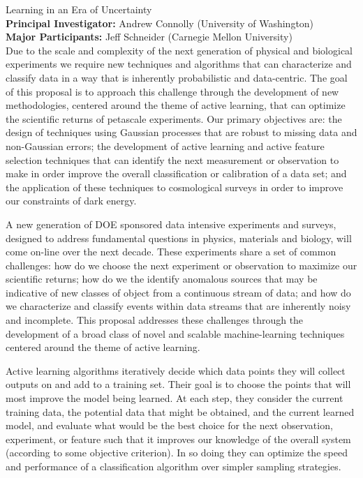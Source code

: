 \documentclass[useAMS,usenatbib,tightenlines,11pt,preprint]{aastex}
\begin{document}
 

  Learning in an Era of Uncertainty \\
{\bf Principal Investigator: } Andrew Connolly (University of Washington)\\
{\bf Major Participants: }  Jeff Schneider (Carnegie Mellon University) \\

 Due to the scale and complexity of
the next generation of physical and biological experiments we require
new techniques and algorithms that can characterize and classify data
in a way that is inherently probabilistic and data-centric.  The goal
of this proposal is to approach this challenge through the development of
new methodologies, centered around the theme of active learning, that
can optimize the scientific returns of petascale experiments. Our
primary objectives are: the design of techniques using Gaussian
processes that are robust to missing data and non-Gaussian errors; the
development of active learning and active feature selection techniques
that can identify the next measurement or observation to make in order 
improve the overall classification or calibration of a data set; and the application
of these techniques to cosmological surveys in order to improve our
constraints of dark energy.

 A new generation of DOE sponsored
data intensive experiments and surveys, designed to address
fundamental questions in physics, materials and biology, will come
on-line over the next decade. These experiments share a set of common
challenges: how do we choose the next experiment or observation to
maximize our scientific returns; how do we the identify anomalous
sources that may be indicative of new classes of object from a
continuous stream of data; and how do we characterize and classify
events within data streams that are inherently noisy and
incomplete. This proposal addresses these challenges through the
development of a broad class of novel and scalable machine-learning
techniques centered around the theme of active learning.

Active learning algorithms iteratively decide which data points they
will collect outputs on and add to a training set.  Their goal is to
choose the points that will most improve the model being learned.  At
each step, they consider the current training data, the potential data
that might be obtained, and the current learned model, and evaluate
what would be the best choice for the next observation, experiment, or
feature such that it improves our knowledge of the overall system
(according to some objective criterion).  In so doing they can
optimize the speed and performance of a classification algorithm over
simpler sampling strategies.
\end{document}
